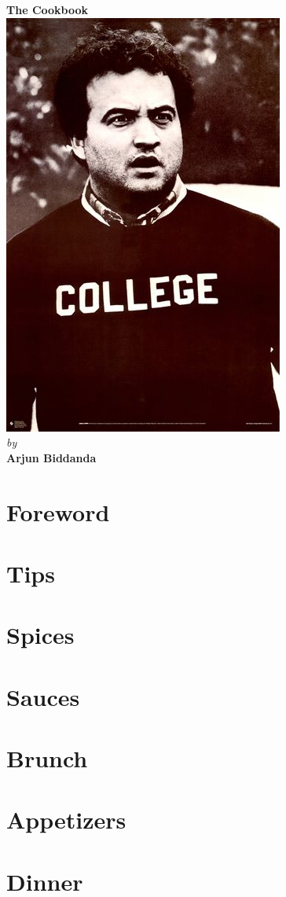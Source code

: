 \documentclass[oneside]{recipe}
\begin{document}
\begin{titlepage}
\begin{center}
	\textbf{\Huge The Cookbook }\\
	\vspace*{\fill}
	\includegraphics[scale=2]{img/college}\\
	\vspace*{\fill}
	\textit{\large by}\\
	\vspace*{4pt}
	\textbf{\large Arjun Biddanda}
	\vspace*{\fill}
	\end{center}
\end{titlepage}

\tableofcontents
\chapter{Foreword}


\chapter{Tips}


\chapter{Spices}


\chapter{Sauces}


\chapter{Brunch}


\chapter{Appetizers}


\chapter{Dinner}

\end{document}
